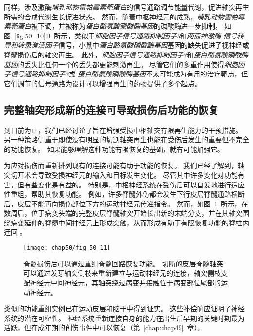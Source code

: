同样，涉及激酶\textit{哺乳动物雷帕霉素靶蛋白}的信号通路调节能量代谢，促进轴突再生所需的合成代谢生长促进状态。
然而，随着中枢神经元的成熟，\textit{哺乳动物雷帕霉素靶蛋白}被下调，并被称为\textit{蛋白酪氨酸磷酸酶基因}的磷酸酶进一步抑制。
如图~\ref{fig:50_10}B~所示，类似于\textit{细胞因子信号通路抑制因子3}和\textit{两面神激酶-信号转导和转录激活因子}信号，小鼠中\textit{蛋白酪氨酸磷酸酶基因}基因的缺失促进了视神经或脊髓损伤后的轴突再生。
此外，\textit{细胞因子信号通路抑制因子3}和\textit{蛋白酪氨酸磷酸酶基因}的丢失比任何一个的丢失都更能刺激再生。
尽管它们的多重作用使得\textit{细胞因子信号通路抑制因子3}或 \textit{蛋白酪氨酸磷酸酶基因}不太可能成为有用的治疗靶点，但它们调节的信号通路为设计可以增强再生的药物提供了多个起点。



\subsection{完整轴突形成新的连接可导致损伤后功能的恢复}

到目前为止，我们已经讨论了旨在增强受损中枢轴突有限再生能力的干预措施。
另一种策略侧重于即使没有明显的切割轴突再生也能在受伤后发生的重要但不完全的功能恢复。
如果能够理解这种功能有限恢复的基础，就有可能加强它。


为应对损伤而重新排列现有的连接可能有助于功能的恢复。
我们已经了解到，轴突切开术会导致受损神经元的输入和目标发生变化。
尽管其中许多变化对功能有害，但有些变化是有益的。
特别是，中枢神经系统在受伤后可以自发地进行适应性重组，帮助其恢复功能。
例如，许多脊髓外伤都会发生下行皮层脊髓通路横断后，皮层不能再向损伤部位下方的运动神经元传递指令。
然而，如图~\ref{fig:50_11}~所示，在数周后，位于病变头端的完整皮层脊髓轴突开始长出新的末端分支，并在其轴突围绕病变延伸的脊髓中间神经元上形成突触，从而形成有助于有限恢复功能的脊柱内迂回 。



\begin{figure}[htbp]
	\centering
	\texttt{[image: chap50/fig\_50\_11]}
	\caption{脊髓损伤后可以通过重组脊髓回路恢复功能。
		切断的皮层脊髓轴突可以通过发芽轴突侧枝来重新建立与运动神经元的连接，轴突侧枝支配神经元中间神经元，其轴突绕过病变并接触位于病变部位尾部的运动神经元\cite{bareyre2004injured}。}
	\label{fig:50_11}
\end{figure}


类似的功能重组实例已在运动皮层和脑干中得到证实。
这些补偿响应证明了神经系统的潜在可塑性。
神经系统重新连接自身的能力在出生后早期的关键时期最为活跃，但在成年期的创伤事件中可以恢复（第~\ref{chap:chap49}~章）。


